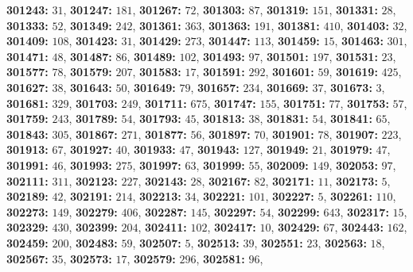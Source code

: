 \textsf{\bfseries 301243:} $31$, \textsf{\bfseries 301247:} $181$, \textsf{\bfseries 301267:} $72$, \textsf{\bfseries 301303:} $87$, \textsf{\bfseries 301319:} $151$, \textsf{\bfseries 301331:} $28$, \textsf{\bfseries 301333:} $52$, \textsf{\bfseries 301349:} $242$, \textsf{\bfseries 301361:} $363$, \textsf{\bfseries 301363:} $191$, \textsf{\bfseries 301381:} $410$, \textsf{\bfseries 301403:} $32$, \textsf{\bfseries 301409:} $108$, \textsf{\bfseries 301423:} $31$, \textsf{\bfseries 301429:} $273$, \textsf{\bfseries 301447:} $113$, \textsf{\bfseries 301459:} $15$, \textsf{\bfseries 301463:} $301$, \textsf{\bfseries 301471:} $48$, \textsf{\bfseries 301487:} $86$, \textsf{\bfseries 301489:} $102$, \textsf{\bfseries 301493:} $97$, \textsf{\bfseries 301501:} $197$, \textsf{\bfseries 301531:} $23$, \textsf{\bfseries 301577:} $78$, \textsf{\bfseries 301579:} $207$, \textsf{\bfseries 301583:} $17$, \textsf{\bfseries 301591:} $292$, \textsf{\bfseries 301601:} $59$, \textsf{\bfseries 301619:} $425$, \textsf{\bfseries 301627:} $38$, \textsf{\bfseries 301643:} $50$, \textsf{\bfseries 301649:} $79$, \textsf{\bfseries 301657:} $234$, \textsf{\bfseries 301669:} $37$, \textsf{\bfseries 301673:} $3$, \textsf{\bfseries 301681:} $329$, \textsf{\bfseries 301703:} $249$, \textsf{\bfseries 301711:} $675$, \textsf{\bfseries 301747:} $155$, \textsf{\bfseries 301751:} $77$, \textsf{\bfseries 301753:} $57$, \textsf{\bfseries 301759:} $243$, \textsf{\bfseries 301789:} $54$, \textsf{\bfseries 301793:} $45$, \textsf{\bfseries 301813:} $38$, \textsf{\bfseries 301831:} $54$, \textsf{\bfseries 301841:} $65$, \textsf{\bfseries 301843:} $305$, \textsf{\bfseries 301867:} $271$, \textsf{\bfseries 301877:} $56$, \textsf{\bfseries 301897:} $70$, \textsf{\bfseries 301901:} $78$, \textsf{\bfseries 301907:} $223$, \textsf{\bfseries 301913:} $67$, \textsf{\bfseries 301927:} $40$, \textsf{\bfseries 301933:} $47$, \textsf{\bfseries 301943:} $127$, \textsf{\bfseries 301949:} $21$, \textsf{\bfseries 301979:} $47$, \textsf{\bfseries 301991:} $46$, \textsf{\bfseries 301993:} $275$, \textsf{\bfseries 301997:} $63$, \textsf{\bfseries 301999:} $55$, \textsf{\bfseries 302009:} $149$, \textsf{\bfseries 302053:} $97$, \textsf{\bfseries 302111:} $311$, \textsf{\bfseries 302123:} $227$, \textsf{\bfseries 302143:} $28$, \textsf{\bfseries 302167:} $82$, \textsf{\bfseries 302171:} $11$, \textsf{\bfseries 302173:} $5$, \textsf{\bfseries 302189:} $42$, \textsf{\bfseries 302191:} $214$, \textsf{\bfseries 302213:} $34$, \textsf{\bfseries 302221:} $101$, \textsf{\bfseries 302227:} $5$, \textsf{\bfseries 302261:} $110$, \textsf{\bfseries 302273:} $149$, \textsf{\bfseries 302279:} $406$, \textsf{\bfseries 302287:} $145$, \textsf{\bfseries 302297:} $54$, \textsf{\bfseries 302299:} $643$, \textsf{\bfseries 302317:} $15$, \textsf{\bfseries 302329:} $430$, \textsf{\bfseries 302399:} $204$, \textsf{\bfseries 302411:} $102$, \textsf{\bfseries 302417:} $10$, \textsf{\bfseries 302429:} $67$, \textsf{\bfseries 302443:} $162$, \textsf{\bfseries 302459:} $200$, \textsf{\bfseries 302483:} $59$, \textsf{\bfseries 302507:} $5$, \textsf{\bfseries 302513:} $39$, \textsf{\bfseries 302551:} $23$, \textsf{\bfseries 302563:} $18$, \textsf{\bfseries 302567:} $35$, \textsf{\bfseries 302573:} $17$, \textsf{\bfseries 302579:} $296$, \textsf{\bfseries 302581:} $96$, 
